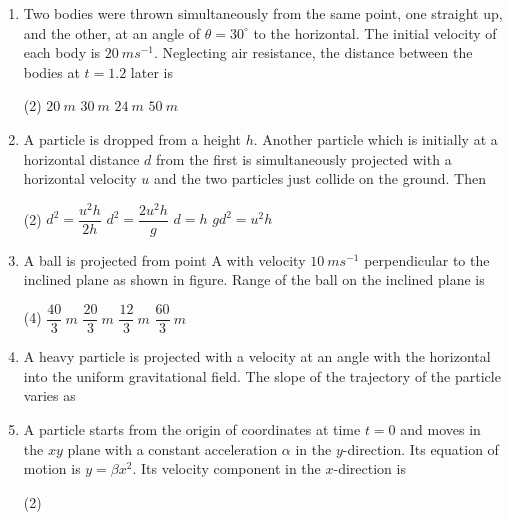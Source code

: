 \documentclass{article}
\renewcommand{\frac}[2]{\dfrac{#1}{#2}}
\begin{document}
\begin{enumerate}
    \item Two bodies were thrown simultaneously from the same point, one straight up, and the other, at an angle of \(\theta = 30^{\circ}\) to the horizontal. The initial velocity of each body is \(20 \ ms^{-1}\). Neglecting air resistance, the distance between the bodies at \(t = 1.2\) later is
    \begin{tasks}(2)
        \task \(20 \ m\)
        \task \(30 \ m\)
        \task \(24 \ m\)
        \task \(50 \ m\)
    \end{tasks}
    \item A particle is dropped from a height \(h\). Another particle which is initially at a horizontal distance \(d\) from the first is simultaneously projected with a horizontal velocity \(u\) and the two particles just collide on the ground. Then
    \begin{tasks}(2)
        \task \(d^2 = \frac{u^2 h}{2h}\)
        \task \(d^2 = \frac{2u^2 h}{g}\)
        \task \(d = h\)
        \task \(gd^2 = u^2 h\)
    \end{tasks}
    \item A ball is projected from point A with velocity \(10 \ ms^{-1}\) perpendicular to the inclined plane as shown in figure. Range of the ball on the inclined plane is
    \begin{tasks}(4)
        \task \(\frac{40}{3} \ m\)
        \task \(\frac{20}{3} \ m\)
        \task \(\frac{12}{3} \ m\)
        \task \(\frac{60}{3} \ m\)
    \end{tasks}
    \item A heavy particle is projected with a velocity at an angle with the horizontal into the uniform gravitational field. The slope of the trajectory of the particle varies as
    \begin{center}
    \end{center}
    \item A particle starts from the origin of coordinates at time \(t = 0\) and moves in the \(xy\) plane with a constant acceleration \(\alpha\) in the \(y\)-direction. Its equation of motion is \(y = \beta x^2\). Its velocity component in the \(x\)-direction is
    \begin{tasks}(2)

\end{tasks}
\end{enumerate}
\end{document}
